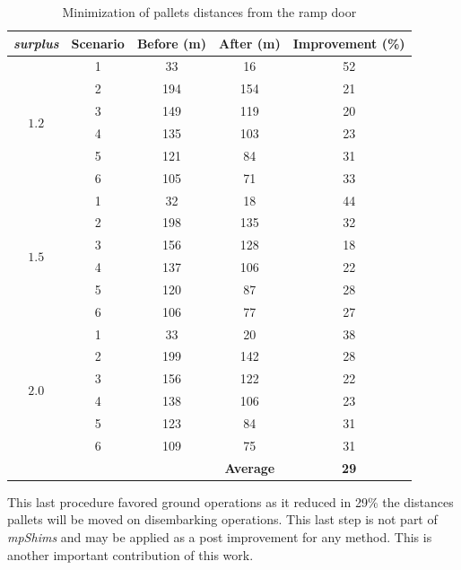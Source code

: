 \documentclass[preprint,authoryear]{elsarticle}
\begin{document}
\begin{table}[H]
\centering
\caption{Minimization of pallets distances from the ramp door}  \label{tab:distRampDoor}
\footnotesize
\begin{tabular}{ccccc}
\toprule

{\it surplus} & {\bf Scenario} & {\bf Before (m)} & {\bf After (m)}  & {\bf Improvement (\%)}  \\
\midrule
\multirow{6}{*}{$1.2$}& 1 &  33  &  16 & 52\\
&                       2 & 194  & 154 & 21\\
&                       3 & 149  & 119 & 20 \\
&                       4 & 135  & 103 & 23 \\
&                       5 & 121  &  84 & 31 \\
&                       6 & 105  &  71 & 33 \\
\midrule
\multirow{6}{*}{$1.5$}& 1 &  32 &  18 & 44 \\
&                       2 & 198 & 135 & 32 \\
&                       3 & 156 & 128 & 18 \\
&                       4 & 137 & 106 & 22\\
&                       5 & 120 &  87 & 28 \\
&                       6 & 106 &  77 & 27 \\
\midrule
\multirow{6}{*}{$2.0$}& 1 &  33 &  20 & 38 \\
&                       2 & 199 & 142 & 28 \\
&                       3 & 156 & 122 & 22 \\
&                       4 & 138 & 106 & 23 \\
&                       5 & 123 &  84 & 31 \\
&                       6 & 109 &  75 & 31 \\
\midrule
&                         &        & {\bf Average} & {\bf 29}\\
\bottomrule	
\end{tabular}
\normalsize
\end{table}

This last procedure favored ground operations as it reduced in 29\% the distances pallets will be moved on disembarking operations. This last step is not part of {\it mpShims} and may be applied as a post improvement for any method. This is another important contribution of this work.
\end{document}
